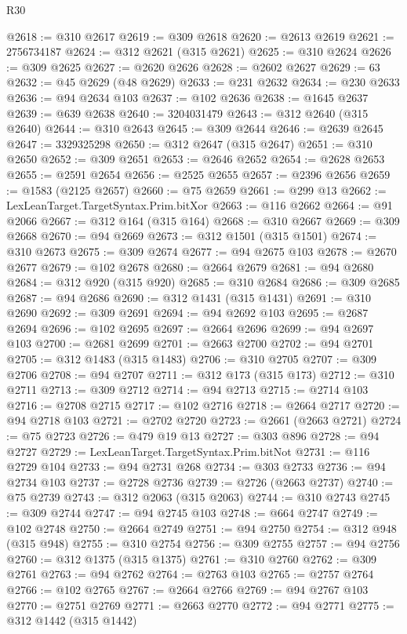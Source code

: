 \begin{lexlean}{R30}
\begin{coremodule}
@2618 := @310 @2617
@2619 := @309 @2618
@2620 := @2613 @2619
@2621 := 2756734187
@2624 := @312 @2621 (@315 @2621)
@2625 := @310 @2624
@2626 := @309 @2625
@2627 := @2620 @2626
@2628 := @2602 @2627
@2629 := 63
@2632 := @45 @2629 (@48 @2629)
@2633 := @231 @2632
@2634 := @230 @2633
@2636 := @94 @2634 @103
@2637 := @102 @2636
@2638 := @1645 @2637
@2639 := @639 @2638
@2640 := 3204031479
@2643 := @312 @2640 (@315 @2640)
@2644 := @310 @2643
@2645 := @309 @2644
@2646 := @2639 @2645
@2647 := 3329325298
@2650 := @312 @2647 (@315 @2647)
@2651 := @310 @2650
@2652 := @309 @2651
@2653 := @2646 @2652
@2654 := @2628 @2653
@2655 := @2591 @2654
@2656 := @2525 @2655
@2657 := @2396 @2656
@2659 := @1583 (@2125 @2657)
@2660 := @75 @2659
@2661 := @299 @13
@2662 := LexLeanTarget.TargetSyntax.Prim.bitXor
@2663 := @116 @2662
@2664 := @91 @2066
@2667 := @312 @164 (@315 @164)
@2668 := @310 @2667
@2669 := @309 @2668
@2670 := @94 @2669
@2673 := @312 @1501 (@315 @1501)
@2674 := @310 @2673
@2675 := @309 @2674
@2677 := @94 @2675 @103
@2678 := @2670 @2677
@2679 := @102 @2678
@2680 := @2664 @2679
@2681 := @94 @2680
@2684 := @312 @920 (@315 @920)
@2685 := @310 @2684
@2686 := @309 @2685
@2687 := @94 @2686
@2690 := @312 @1431 (@315 @1431)
@2691 := @310 @2690
@2692 := @309 @2691
@2694 := @94 @2692 @103
@2695 := @2687 @2694
@2696 := @102 @2695
@2697 := @2664 @2696
@2699 := @94 @2697 @103
@2700 := @2681 @2699
@2701 := @2663 @2700
@2702 := @94 @2701
@2705 := @312 @1483 (@315 @1483)
@2706 := @310 @2705
@2707 := @309 @2706
@2708 := @94 @2707
@2711 := @312 @173 (@315 @173)
@2712 := @310 @2711
@2713 := @309 @2712
@2714 := @94 @2713
@2715 := @2714 @103
@2716 := @2708 @2715
@2717 := @102 @2716
@2718 := @2664 @2717
@2720 := @94 @2718 @103
@2721 := @2702 @2720
@2723 := @2661 (@2663 @2721)
@2724 := @75 @2723
@2726 := @479 @19 @13
@2727 := @303 @896
@2728 := @94 @2727
@2729 := LexLeanTarget.TargetSyntax.Prim.bitNot
@2731 := @116 @2729 @104
@2733 := @94 @2731 @268
@2734 := @303 @2733
@2736 := @94 @2734 @103
@2737 := @2728 @2736
@2739 := @2726 (@2663 @2737)
@2740 := @75 @2739
@2743 := @312 @2063 (@315 @2063)
@2744 := @310 @2743
@2745 := @309 @2744
@2747 := @94 @2745 @103
@2748 := @664 @2747
@2749 := @102 @2748
@2750 := @2664 @2749
@2751 := @94 @2750
@2754 := @312 @948 (@315 @948)
@2755 := @310 @2754
@2756 := @309 @2755
@2757 := @94 @2756
@2760 := @312 @1375 (@315 @1375)
@2761 := @310 @2760
@2762 := @309 @2761
@2763 := @94 @2762
@2764 := @2763 @103
@2765 := @2757 @2764
@2766 := @102 @2765
@2767 := @2664 @2766
@2769 := @94 @2767 @103
@2770 := @2751 @2769
@2771 := @2663 @2770
@2772 := @94 @2771
@2775 := @312 @1442 (@315 @1442)

\end{coremodule}
\end{lexlean}
